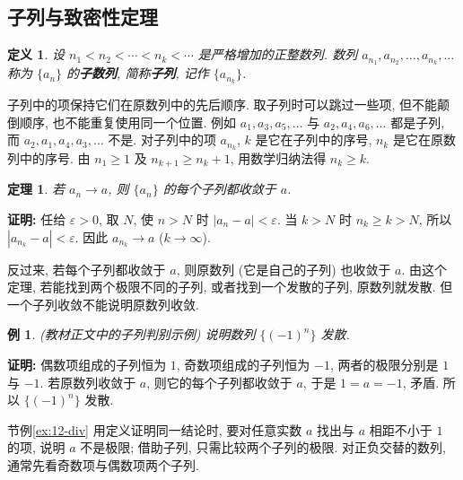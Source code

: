 \documentclass[UTF8,openany]{ctexbook}
\theoremstyle{chinesetextbook}
\newtheorem{definition}{定义}[section]
\newtheorem{example}{例}[section]
\newtheorem{theorem}{定理}[section]
\newenvironment{cnproof}{\par\indent\textbf{证明:} \ignorespaces}{\par}
\begin{document}
\subsection{子列与致密性定理}
\begin{definition}
设 $n_1<n_2<\cdots<n_k<\cdots$ 是严格增加的正整数列. 数列 $a_{n_1},a_{n_2},\ldots,a_{n_k},\ldots$ 称为 $\{a_n\}$ 的\textbf{子数列}, 简称\textbf{子列}, 记作 $\{a_{n_k}\}$.
\end{definition}
子列中的项保持它们在原数列中的先后顺序. 取子列时可以跳过一些项, 但不能颠倒顺序, 也不能重复使用同一个位置. 例如 $a_1,a_3,a_5,\ldots$ 与 $a_2,a_4,a_6,\ldots$ 都是子列, 而 $a_2,a_1,a_4,a_3,\ldots$ 不是. 对子列中的项 $a_{n_k}$, $k$ 是它在子列中的序号, $n_k$ 是它在原数列中的序号. 由 $n_1\ge1$ 及 $n_{k+1}\ge n_k+1$, 用数学归纳法得 $n_k\ge k$.
\begin{theorem}
若 $a_n\to a$, 则 $\{a_n\}$ 的每个子列都收敛于 $a$.
\end{theorem}
\begin{cnproof}
任给 $\varepsilon>0$, 取 $N$, 使 $n>N$ 时 $|a_n-a|<\varepsilon$. 当 $k>N$ 时 $n_k\ge k>N$, 所以 $|a_{n_k}-a|<\varepsilon$. 因此 $a_{n_k}\to a$ ($k\to\infty$).
\end{cnproof}
反过来, 若每个子列都收敛于 $a$, 则原数列 (它是自己的子列) 也收敛于 $a$. 由这个定理, 若能找到两个极限不同的子列, 或者找到一个发散的子列, 原数列就发散. 但一个子列收敛不能说明原数列收敛.
\begin{example}\label{ex:14-sub}
\textnormal{(教材正文中的子列判别示例)} 说明数列 $\{(-1)^n\}$ 发散.
\end{example}
\begin{cnproof}
偶数项组成的子列恒为 $1$, 奇数项组成的子列恒为 $-1$, 两者的极限分别是 $1$ 与 $-1$. 若原数列收敛于 $a$, 则它的每个子列都收敛于 $a$, 于是 $1=a=-1$, 矛盾. 所以 $\{(-1)^n\}$ 发散.
\end{cnproof}
1.2 节例\ref{ex:12-div} 用定义证明同一结论时, 要对任意实数 $a$ 找出与 $a$ 相距不小于 $1$ 的项, 说明 $a$ 不是极限; 借助子列, 只需比较两个子列的极限. 对正负交替的数列, 通常先看奇数项与偶数项两个子列.
\end{document}
